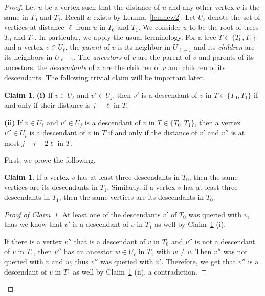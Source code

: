 \documentclass[12pt,a4paper]{amsart}
\theoremstyle{plain}
\theoremstyle{definition}
\newtheorem{claim}[theorem]{Claim}
\begin{document}
\begin{proof}
Let $u$ be a vertex such that the distance of $u$ and any other vertex $v$ is the same in $T_0$ and $T_1$. Recall $u$ exists by Lemma~\ref{lemnew2}. Let $U_\ell$ denote the set of vertices at distance $\ell$ from $u$ in $T_0$ and $T_1$. We consider $u$ to be the root of trees $T_0$ and $T_1$. In particular, we apply the usual terminology. For a tree $T \in \{T_0, T_1\}$ and a vertex $v\in U_\ell$, the \textit{parent} of $v$ is its neighbor in $U_{\ell-1}$ and its \textit{children} are its neighbors in $U_{\ell+1}$. The \textit{ancestors} of $v$ are the parent of $v$ and parents of its ancestors, the \textit{descendants} of $v$ are the children of $v$ and children of its descendants. The following trivial claim will be important later.

\begin{claim}\label{cla1}
  \textbf{(i)}  If $v\in U_\ell$ and $v'\in U_j$, then $v'$ is a descendant of $v$ in $T \in \{T_0, T_1\}$ if and only if their distance is $j-\ell$ in $T$.

  \textbf{(ii)} If $v\in U_\ell$ and $v'\in U_j$ is a descendant of $v$ in $T \in \{T_0, T_1\}$, then a vertex $v''\in U_i$ is a descendant of $v$ in $T$ if and only if the distance of $v'$ and $v''$ is at most $j+i-2\ell$ in $T$. 
\end{claim}

First, we prove the following.

\begin{claim}\label{cla2}
    If a vertex $v$ has at least three descendants in $T_0$, then the same vertices are its descendants in $T_1$. Similarly, if a vertex $v$ has at least three descendants in $T_1$, then the same vertices are its descendants in $T_0$.
\end{claim}

\begin{proof}[Proof of Claim~\ref{cla2}] 
At least one of the descendants $v'$ of $T_0$ was queried with $v$, thus we know that $v'$ is a descendant of $v$ in $T_1$ as well by Claim~\ref{cla1} (i).

If there is a vertex $v''$ that is a descendant of $v$ in $T_0$ and $v''$ is not a descendant of $v$ in $T_1$, then $v''$ has an ancestor $w\in U_\ell$ in $T_1$ with $w\neq v$. Then $v''$ was not queried with $v$ and $w$, thus $v''$ was queried with $v'$.
Therefore, we get that $v''$ is a descendant of $v$ in $T_1$ as well by Claim~\ref{cla1} (ii), a contradiction.
\end{proof}



\end{proof}
\end{document}

